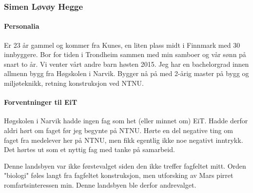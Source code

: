 \subsubsection{Simen Løvøy Hegge}

\paragraph{Personalia}
Er 23 år gammel og kommer fra Kunes, en liten plass midt i Finnmark med 30 innbyggere.
Bor for tiden i Trondheim sammen med min samboer og vår sønn på snart to år.
Vi venter vårt andre barn høsten 2015.
Jeg har en bachelorgrad innen allmenn bygg fra Høgskolen i Narvik.
Bygger nå på med 2-årig master på bygg og miljøteknikk, retning konstruksjon ved NTNU.

\paragraph{Forventninger til EiT}
Høgskolen i Narvik hadde ingen fag som het (eller minnet om) EiT.
Hadde derfor aldri hørt om faget før jeg begynte på NTNU.
Hørte en del negative ting om faget fra medelever her på NTNU, men fikk egentlig ikke noe negativt inntrykk.
Det hørtes ut som et nyttig fag med tanke på samarbeid.

Denne landsbyen var ikke førstevalget siden den ikke treffer fagfeltet mitt.
Orden "biologi" føles langt fra fagfeltet konstruksjon, men utforsking av Mars pirret romfartsinteressen min.
Denne landsbyen ble derfor andrevalget.